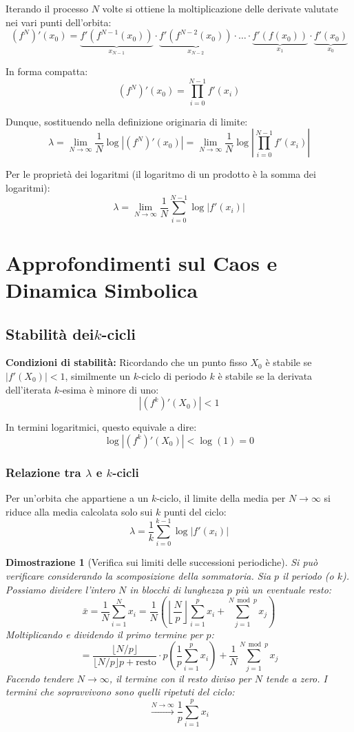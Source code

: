 \documentclass[openany]{book}
\newtheorem*{dimostrazione}{Dimostrazione}
\theoremstyle{definition}
\theoremstyle{remark}
\begin{document}
Iterando il processo $N$ volte si ottiene la moltiplicazione delle derivate valutate nei vari punti dell'orbita:
$$ (f^N)'(x_0) = \underbrace{f'(f^{N-1}(x_0))}_{x_{N-1}} \cdot \underbrace{f'(f^{N-2}(x_0))}_{x_{N-2}} \cdot \dots \cdot \underbrace{f'(f(x_0))}_{x_1} \cdot \underbrace{f'(x_0)}_{x_0} $$

In forma compatta:
$$ (f^N)'(x_0) = \prod_{i=0}^{N-1} f'(x_i) $$

Dunque, sostituendo nella definizione originaria di limite:
$$ \lambda = \lim_{N \to \infty} \frac{1}{N} \log |(f^N)'(x_0)| = \lim_{N \to \infty} \frac{1}{N} \log \left| \prod_{i=0}^{N-1} f'(x_i) \right| $$

Per le proprietà dei logaritmi (il logaritmo di un prodotto è la somma dei logaritmi):
$$ \lambda = \lim_{N \to \infty} \frac{1}{N} \sum_{i=0}^{N-1} \log |f'(x_i)| $$

\section{Approfondimenti sul Caos e Dinamica Simbolica}

\subsection{Stabilità dei\texorpdfstring{$k$-cicli}{k cicli}}
\textbf{Condizioni di stabilità:} Ricordando che un punto fisso $X_0$ è stabile se $|f'(X_0)| < 1$, similmente un $k$-ciclo di periodo $k$ è stabile se la derivata dell'iterata $k$-esima è minore di uno:
$$ |(f^k)'(X_0)| < 1 $$

In termini logaritmici, questo equivale a dire:
$$ \log |(f^k)'(X_0)| < \log(1) = 0 $$

\subsubsection*{Relazione tra $\lambda$ e $k$-cicli}
Per un'orbita che appartiene a un $k$-ciclo, il limite della media per $N \to \infty$ si riduce alla media calcolata solo sui $k$ punti del ciclo:
$$ \lambda = \frac{1}{k} \sum_{i=0}^{k-1} \log |f'(x_i)| $$

\begin{dimostrazione}[Verifica sui limiti delle successioni periodiche]
Si può verificare considerando la scomposizione della sommatoria. Sia $p$ il periodo (o $k$). Possiamo dividere l'intero $N$ in blocchi di lunghezza $p$ più un eventuale resto:
$$ \bar{x} = \frac{1}{N} \sum_{i=1}^N x_i = \frac{1}{N} \left( \left\lfloor \frac{N}{p} \right\rfloor \sum_{i=1}^p x_i + \sum_{j=1}^{N \bmod p} x_j \right) $$
Moltiplicando e dividendo il primo termine per $p$:
$$ = \frac{\lfloor N/p \rfloor}{\lfloor N/p \rfloor p + \text{resto}} \cdot p \left( \frac{1}{p} \sum_{i=1}^p x_i \right) + \frac{1}{N} \sum_{j=1}^{N \bmod p} x_j $$
Facendo tendere $N \to \infty$, il termine con il resto diviso per $N$ tende a zero. I termini che sopravvivono sono quelli ripetuti del ciclo:
$$ \xrightarrow{N \to \infty} \frac{1}{p} \sum_{i=1}^p x_i $$
\end{dimostrazione}
\end{document}
